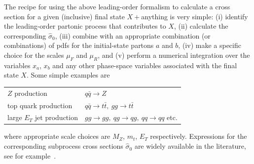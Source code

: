 \documentclass[12pt]{iopart}
\def\sighat{\hat{\sigma}}
\begin{document}
The recipe for using the above leading-order formalism to calculate a cross section for a given (inclusive)
final state $X + $anything is very simple: (i) identify the leading-order partonic process that contributes to
$X$, (ii) calculate the corresponding $\sighat_0$, (iii) combine with an appropriate combination (or
combinations) of pdfs for the initial-state partons $a$ and $b$, (iv) make a specific choice for the scales
$\mu_F$ and $\mu_R$, and (v) perform a numerical integration over the variables $x_a$, $x_b$ and any other
phase-space variables associated with the final state $X$. Some simple examples are 
%
\bigskip
\begin{center}
\begin{tabular}{|l|l|}
\hline
$Z$ production & $q \bar q \to Z$ \\
top quark production & $ q \bar q \to t \bar t, \ g g \to t \bar t$ \\
large $E_T$ jet production &  $ gg \to gg, \ qg \to qg, \ qq \to qq$ etc. \\
\hline
\end{tabular} 
\end{center}
%
\bigskip
%
\noindent where appropriate scale choices are $M_Z$, $m_t$, $E_T$ respectively. Expressions for the
corresponding subprocess cross  sections $\sighat_0$ are widely available in the literature, see for example~\cite{Ellis:1991qj}.
\end{document}
